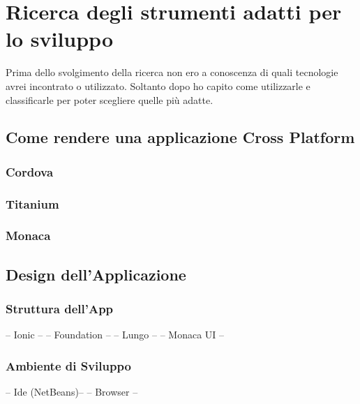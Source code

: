 \chapter{Ricerca degli strumenti adatti per lo sviluppo}
Prima dello svolgimento della ricerca non ero a conoscenza di quali tecnologie avrei incontrato o utilizzato. Soltanto dopo ho capito come utilizzarle e classificarle per poter scegliere quelle più adatte.
\section{Come rendere una applicazione Cross Platform}
\subsection{Cordova}
\subsection{Titanium}
\subsection{Monaca}
\section{Design dell'Applicazione}
\subsection{Struttura dell'App}
-- Ionic --
-- Foundation --
-- Lungo --
-- Monaca UI --
\subsection{Ambiente di Sviluppo}
-- Ide (NetBeans)--
-- Browser --

